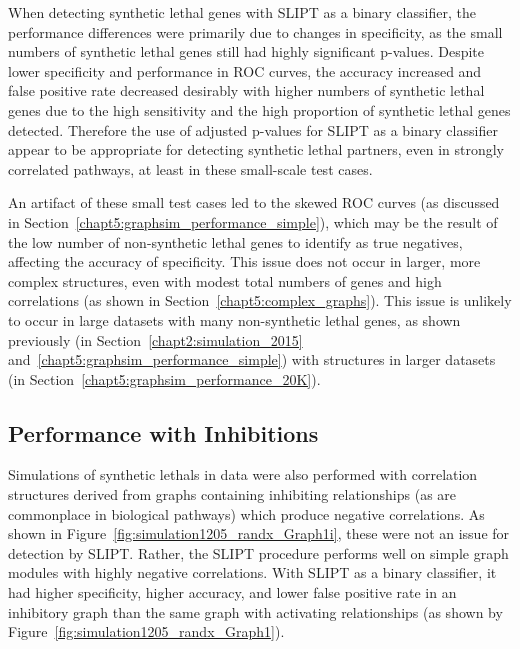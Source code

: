 When detecting \gls{synthetic lethal} genes with \gls{SLIPT} as a binary classifier, the performance differences were primarily due to changes in specificity, as the small numbers of \gls{synthetic lethal} genes still had highly significant p-values. Despite lower specificity and performance in \gls{ROC} curves, the accuracy increased and false positive rate decreased desirably with higher numbers of \gls{synthetic lethal} genes due to the high sensitivity and the high proportion of \gls{synthetic lethal} genes detected. Therefore the use of adjusted p-values for \gls{SLIPT} as a binary classifier appear to be appropriate for detecting \gls{synthetic lethal} partners, even in strongly correlated pathways, at least in these small-scale test cases.

An artifact of these small test cases led to the skewed \gls{ROC} curves (as discussed in Section~\ref{chapt5:graphsim_performance_simple}), which may be the result of the low number of non-synthetic lethal genes to identify as true negatives, affecting the accuracy of specificity. This issue does not occur in larger, more complex  structures, even with modest total numbers of genes and high correlations (as shown in Section~\ref{chapt5:complex_graphs}). This issue is unlikely to occur in large  datasets with many non-synthetic lethal genes, as shown previously (in Section~\ref{chapt2:simulation_2015} and~\ref{chapt5:graphsim_performance_simple}) with  structures in larger datasets (in Section~\ref{chapt5:graphsim_performance_20K}). 



\subsection{Performance with Inhibitions}
\label{chapt5:graphsim_performance_inhib}


Simulations of \glspl{synthetic lethal} in  data were also performed with correlation structures derived from \glspl{graph} containing inhibiting relationships (as are commonplace in biological pathways) which produce negative correlations. As shown in Figure~\ref{fig:simulation1205_randx_Graph1i}, these were not an issue for detection by \gls{SLIPT}. Rather, the \gls{SLIPT} procedure performs well on simple graph modules with highly negative correlations. With \gls{SLIPT} as a binary classifier, it had higher specificity, higher accuracy, and lower false positive rate in an inhibitory graph than the same graph with activating relationships (as shown by Figure~\ref{fig:simulation1205_randx_Graph1}).

